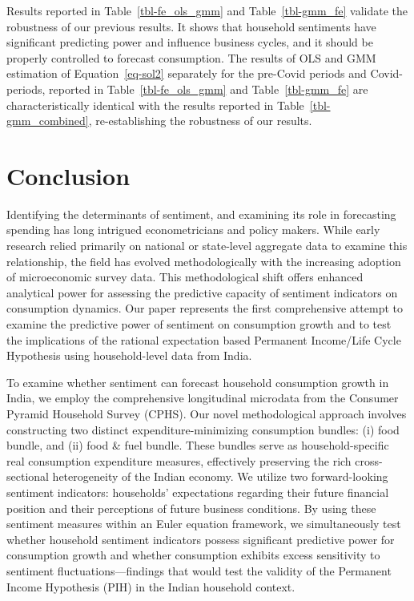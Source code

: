 \documentclass[
  abstract]{scrartcl}
\begin{document}
Results reported in {Table~\ref{tbl-fe_ols_gmm} and
Table~\ref{tbl-gmm_fe}} validate the robustness of our previous results.
It shows that household sentiments have significant predicting power and
influence business cycles, and it should be properly controlled to
forecast consumption. The results of OLS and GMM estimation of
Equation~\ref{eq-sol2} separately for the pre-Covid periods and
Covid-periods, reported in {Table~\ref{tbl-fe_ols_gmm} and
Table~\ref{tbl-gmm_fe}} are characteristically identical with the
results reported in Table~\ref{tbl-gmm_combined}, re-establishing the
robustness of our results.

\section{Conclusion}\label{sec-5}

Identifying the determinants of sentiment, and examining its role in
forecasting spending has long intrigued econometricians and policy
makers. While early research relied primarily on national or state-level
aggregate data to examine this relationship, the field has evolved
methodologically with the increasing adoption of microeconomic survey
data. This methodological shift offers enhanced analytical power for
assessing the predictive capacity of sentiment indicators on consumption
dynamics. Our paper represents the first comprehensive attempt to
examine the predictive power of sentiment on consumption growth and to
test the implications of the rational expectation based Permanent
Income/Life Cycle Hypothesis using household-level data from India.

To examine whether sentiment can forecast household consumption growth
in India, we employ the comprehensive longitudinal microdata from the
Consumer Pyramid Household Survey (CPHS). Our novel methodological
approach involves constructing two distinct expenditure-minimizing
consumption bundles: (i) food bundle, and (ii) food \& fuel bundle.
These bundles serve as household-specific real consumption expenditure
measures, effectively preserving the rich cross-sectional heterogeneity
of the Indian economy. We utilize two forward-looking sentiment
indicators: households' expectations regarding their future financial
position and their perceptions of future business conditions. By using
these sentiment measures within an Euler equation framework, we
simultaneously test whether household sentiment indicators possess
significant predictive power for consumption growth and whether
consumption exhibits excess sensitivity to sentiment
fluctuations---findings that would test the validity of the Permanent
Income Hypothesis (PIH) in the Indian household context.
\end{document}
